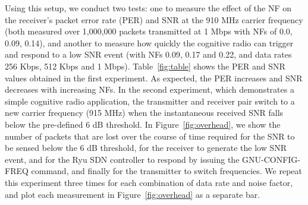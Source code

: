 Using this setup, we conduct two tests: one to measure the effect of the NF on the receiver's packet error rate (PER) and SNR at the 910 MHz carrier frequency (both measured over 1,000,000 packets transmitted at 1 Mbps with NFs of 0.0, 0.09, 0.14), and another to measure how quickly the cognitive radio can trigger and respond to a low SNR event (with NFs 0.09, 0.17 and 0.22, and data rates 256 Kbps, 512 Kbps and 1 Mbps).
Table~\ref{fig:table} shows the PER and SNR values obtained in the first experiment. As expected, the PER increases and SNR decreases with increasing NFs. 
In the second experiment, which demonstrates a simple cognitive radio application, the transmitter and receiver pair switch to a new carrier frequency (915 MHz) when the instantaneous received SNR falls below the pre-defined 6 dB threshold. In Figure~\ref{fig:overhead}, we show the number of packets that are lost over the course of time required for the SNR to be sensed below the 6 dB threshold, for the receiver to generate the low SNR event, and for the Ryu SDN controller to respond by issuing the {GNU-CONFIG-FREQ} command, and finally for the transmitter to switch frequencies. We repeat this experiment three times for each combination of data rate and noise factor, and plot each measurement in Figure~\ref{fig:overhead} as a separate bar. %
